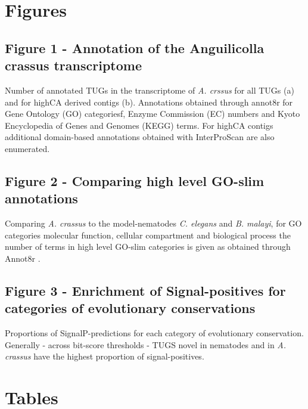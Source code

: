 \documentclass[10pt]{bmc_article}
\newenvironment{bmcformat}{\begin{raggedright}\baselineskip20pt\sloppy\setboolean{publ}{false}}{\end{raggedright}\baselineskip20pt\sloppy}
\begin{document}
\begin{bmcformat}
\section*{Figures}

\subsection*{Figure 1 - Annotation of the Anguilicolla crassus transcriptome}
 
Number of annotated TUGs in the transcriptome of \textit{A. crssus}
for all TUGs (a) and for highCA derived contigs (b).  Annotations
obtained through annot8r \cite{schmid_annot8r:_2008} for Gene Ontology
(GO) categoriesf, Enzyme Commission (EC) numbers and Kyoto
Encyclopedia of Genes and Genomes (KEGG) terms. For highCA contigs
additional domain-based annotations obtained with InterProScan
\cite{pmid11590104} are also enumerated.

\subsection*{Figure 2 - Comparing high level GO-slim annotations}

Comparing \textit{A. crassus} to the model-nematodes
\textit{C. elegans} and \textit{B. malayi}, for GO categories
molecular function, cellular compartment and biological process the
number of terms in high level GO-slim categories is given as obtained
through Annot8r \cite{schmid_annot8r:_2008}.

\subsection*{Figure 3 - Enrichment of Signal-positives for categories
  of evolutionary conservations}

Proportions of SignalP-predictions for each category of evolutionary
conservation. Generally - across bit-score thresholds - TUGS novel in
nematodes and in \textit{A. crassus} have the highest proportion of
signal-positives.


\newpage

\section*{Tables}

\end{bmcformat}
\end{document}
